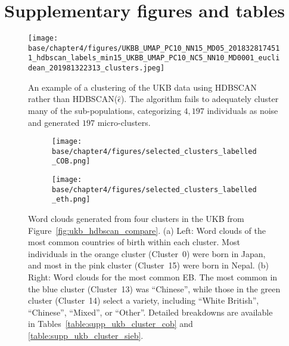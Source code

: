 \section{Supplementary figures and tables}

\begin{figure}[!ht]
  \centering
    \texttt{[image: base/chapter4/figures/UKBB\_UMAP\_PC10\_NN15\_MD05\_2018328174511\_hdbscan\_labels\_min15\_UKBB\_UMAP\_PC10\_NC5\_NN10\_MD0001\_euclidean\_201981322313\_clusters.jpeg]}
  \caption[Clustering the UKB with basic HDBSCAN]{An example of a clustering of the UKB data using HDBSCAN rather than HDBSCAN($\hat{\epsilon}$). The algorithm fails to adequately cluster many of the sub-populations, categorizing $4,197$ individuals as noise and generated $197$ micro-clusters.}
    \label{fig:supp_ukb_hdbscan_original}  
\end{figure}

\clearpage

\begin{figure}[ht]
  \centering
  \begin{subfigure}[b]{0.45\linewidth}
    \texttt{[image: base/chapter4/figures/selected\_clusters\_labelled\_COB.png]}
    \caption{}
    \label{fig:supp_ukb_hdbscan_top1}
  \end{subfigure}
  \begin{subfigure}[b]{0.45\linewidth}
    \texttt{[image: base/chapter4/figures/selected\_clusters\_labelled\_eth.png]}
    \caption{}
    \label{fig:supp_ukb_hdbscan_top2}
  \end{subfigure}
  \caption[Word clouds generated from four clusters in the UKB]{Word clouds generated from four clusters in the UKB from Figure~\ref{fig:ukb_hdbscan_compare}. (a) Left: Word clouds of the most common countries of birth within each cluster. Most individuals in the orange cluster (Cluster~0) were born in Japan, and most in the pink cluster (Cluster~15) were born in Nepal. (b) Right: Word clouds for the most common EB. The most common in the blue cluster (Cluster~13) was ``Chinese'', while those in the green cluster (Cluster~14) select a variety, including ``White British'', ``Chinese'', ``Mixed'', or ``Other''. Detailed breakdowns are available in Tables~\ref{table:supp_ukb_cluster_cob} and \ref{table:supp_ukb_cluster_sieb}.}
  \label{fig:supp_ukb_hdbscan_top}
\end{figure}

